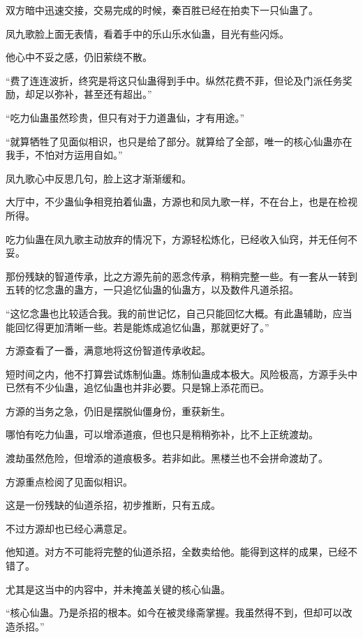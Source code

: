 
\begin{this_body}

双方暗中迅速交接，交易完成的时候，秦百胜已经在拍卖下一只仙蛊了。

凤九歌脸上面无表情，看着手中的乐山乐水仙蛊，目光有些闪烁。

他心中不妥之感，仍旧萦绕不散。

“费了连连波折，终究是将这只仙蛊得到手中。纵然花费不菲，但论及门派任务奖励，却足以弥补，甚至还有超出。”

“吃力仙蛊虽然珍贵，但只有对于力道蛊仙，才有用途。”

“就算牺牲了见面似相识，也只是给了部分。就算给了全部，唯一的核心仙蛊亦在我手，不怕对方运用自如。”

凤九歌心中反思几句，脸上这才渐渐缓和。

大厅中，不少蛊仙争相竞拍着仙蛊，方源也和凤九歌一样，不在台上，也是在检视所得。

吃力仙蛊在凤九歌主动放弃的情况下，方源轻松炼化，已经收入仙窍，并无任何不妥。

那份残缺的智道传承，比之方源先前的恶念传承，稍稍完整一些。有一套从一转到五转的忆念蛊的蛊方，一只追忆仙蛊的仙蛊方，以及数件凡道杀招。

“这忆念蛊也比较适合我。我的前世记忆，自己只能回忆大概。有此蛊辅助，应当能回忆得更加清晰一些。若是能炼成追忆仙蛊，那就更好了。”

方源查看了一番，满意地将这份智道传承收起。

短时间之内，他不打算尝试炼制仙蛊。炼制仙蛊成本极大。风险极高，方源手头中已然有不少仙蛊，追忆仙蛊也并非必要。只是锦上添花而已。

方源的当务之急，仍旧是摆脱仙僵身份，重获新生。

哪怕有吃力仙蛊，可以增添道痕，但也只是稍稍弥补，比不上正统渡劫。

渡劫虽然危险，但增添的道痕极多。若非如此。黑楼兰也不会拼命渡劫了。

方源重点检阅了见面似相识。

这是一份残缺的仙道杀招，初步推断，只有五成。

不过方源却也已经心满意足。

他知道。对方不可能将完整的仙道杀招，全数卖给他。能得到这样的成果，已经不错了。

尤其是这当中的内容中，并未掩盖关键的核心仙蛊。

“核心仙蛊。乃是杀招的根本。如今在被灵缘斋掌握。我虽然得不到，但却可以改造杀招。”


\end{this_body}
